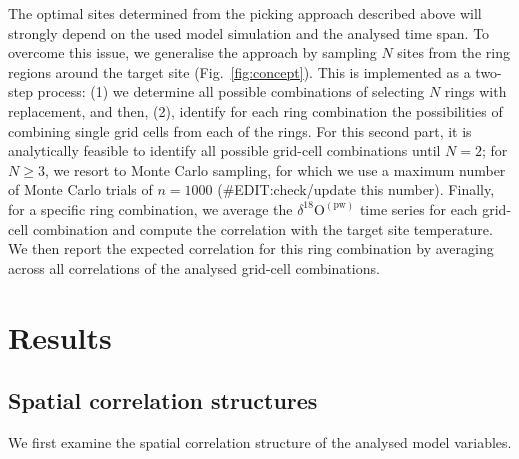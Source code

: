 \documentclass[cp, manuscript]{copernicus}
\begin{document}
The optimal sites determined from the picking approach described above will
strongly depend on the used model simulation and the analysed time span. To
overcome this issue, we generalise the approach by sampling $N$ sites from the
ring regions around the target site (Fig.~\ref{fig:concept}).  This is
implemented as a two-step process: (1) we determine all possible combinations of
selecting $N$ rings with replacement, and then, (2), identify for each ring
combination the possibilities of combining single grid cells from each of the
rings. For this second part, it is analytically feasible to identify all
possible grid-cell combinations until $N=2$; for $N\geq3$, we resort to Monte
Carlo sampling, for which we use a maximum number of Monte Carlo trials of
$n=1000$ (\#EDIT:check/update this number). Finally, for a specific ring
combination, we average the $\delta^{18}\mathrm{O}^{\mathrm{(pw)}}$ time series
for each grid-cell combination and compute the correlation with the target site
temperature. We then report the expected correlation for this ring combination
by averaging across all correlations of the analysed grid-cell combinations.

\section{Results}\label{results}

\subsection{Spatial correlation structures}\label{results:cor.struct}

We first examine the spatial correlation structure of the analysed model
variables.
\end{document}

